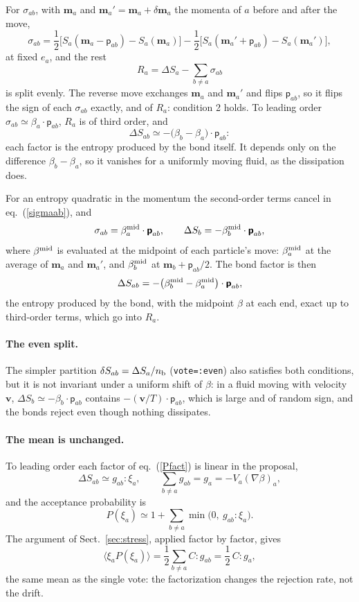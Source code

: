 \documentclass[11pt,aps,preprint,nofootinbib,superscriptaddress,tightenlines]{revtex4-2}
\def\st{\begin{equation}}
\def\stp{\end{equation}}
\def\Eq#1{eq.~(\ref{#1})}
\def\Sect#1{Sect.~\ref{#1}}
\newcommand{\pf}{\bm{\mathsf p}}
\newcommand{\avg}[1]{\langle #1\rangle}
\let\oldparagraph\paragraph
\renewcommand{\paragraph}{\par\bigskip\oldparagraph}
\begin{document}
For $\sigma_{ab}$, with $\bm m_a$ and
$\bm m_a'=\bm m_a+\delta\bm m_a$ the momenta of $a$ before and after the move,
\st
\sigma_{ab}=\frac12\Big[S_a(\bm m_a-\pf_{ab})-S_a(\bm m_a)\Big]
-\frac12\Big[S_a(\bm m_a'+\pf_{ab})-S_a(\bm m_a')\Big],
\label{sigmaab}
\stp
at fixed $e_a$, and the rest
\st
R_a=\Delta S_a-\sum_{b\neq a}\sigma_{ab}
\stp
is split evenly.  The reverse move exchanges $\bm m_a$ and $\bm m_a'$ and flips
$\pf_{ab}$, so it flips the sign of each $\sigma_{ab}$ exactly, and of $R_a$:
condition 2 holds.  To leading order $\sigma_{ab}\simeq\beta_a\cdot\pf_{ab}$, $R_a$ is of
third order, and
\st
\Delta S_{ab}\simeq-\big(\beta_b-\beta_a\big)\cdot\pf_{ab} :
\stp
each factor is the entropy produced by the bond itself.  It depends only on the
difference $\beta_b-\beta_a$, so it vanishes for a uniformly moving fluid, as the
dissipation does.

For an entropy quadratic in the momentum the second-order terms
cancel in \Eq{sigmaab}, and
\st
\sigma_{ab}=\beta_a^{\rm mid}\cdot\pf_{ab},\qquad
\Delta S_b=-\beta_b^{\rm mid}\cdot\pf_{ab},
\stp
where $\beta^{\rm mid}$ is evaluated at the midpoint of each particle's move:
$\beta_a^{\rm mid}$ at the average of $\bm m_a$ and $\bm m_a'$, and $\beta_b^{\rm mid}$ at
$\bm m_b+\pf_{ab}/2$.  The bond factor is then
\st
\Delta S_{ab}=-\big(\beta_b^{\rm mid}-\beta_a^{\rm mid}\big)\cdot\pf_{ab} ,
\stp
the entropy produced by the bond, with the midpoint $\beta$ at each end, exact up
to third-order terms, which go into $R_a$.

\paragraph{The even split.}  The simpler partition $\delta S_{ab}=\Delta S_a/n_{\rm b}$
(\texttt{vote=:even}) also satisfies both conditions, but it
is not invariant under a uniform shift of $\beta$: in a fluid moving with
velocity $\bm v$, $\Delta S_b\simeq-\beta_b\cdot\pf_{ab}$ contains $-(\bm v/T)\cdot\pf_{ab}$,
which is large and of random sign, and the bonds reject even though nothing
dissipates.

\paragraph{The mean is unchanged.}  To leading order each factor of \Eq{Pfact} is linear in
the proposal,
\st
\Delta S_{ab}\simeq g_{ab}{:}\xi_a ,\qquad
\sum_{b\neq a}g_{ab}=g_a=-V_a(\nabla\beta)_a ,
\stp
and the acceptance probability is
\st
P(\xi_a)\simeq1+\sum_{b\neq a}\min\big(0,\ g_{ab}{:}\xi_a\big).
\stp
The argument of \Sect{sec:stress}, applied factor by factor, gives
\st
\avg{\xi_aP(\xi_a)}=\frac12\sum_{b\neq a}C{:}g_{ab}=\frac12\,C{:}g_a ,
\stp
the same mean as the single vote: the factorization changes the rejection rate, not the drift.
\end{document}
